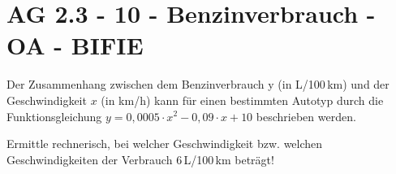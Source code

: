 \section{AG 2.3 - 10 - Benzinverbrauch - OA - BIFIE}

\begin{beispiel}[AG 2.3]{1} %
Der Zusammenhang zwischen dem Benzinverbrauch y (in L/100\,km) und der Geschwindigkeit $x$ (in km/h) kann für einen bestimmten Autotyp durch die Funktionsgleichung
$y = 0,0005 \cdot x^2- 0,09 \cdot x + 10$ beschrieben werden. 
\leer

Ermittle rechnerisch, bei welcher Geschwindigkeit bzw. welchen Geschwindigkeiten der Verbrauch 6\,L/100\,km beträgt!

\end{beispiel}